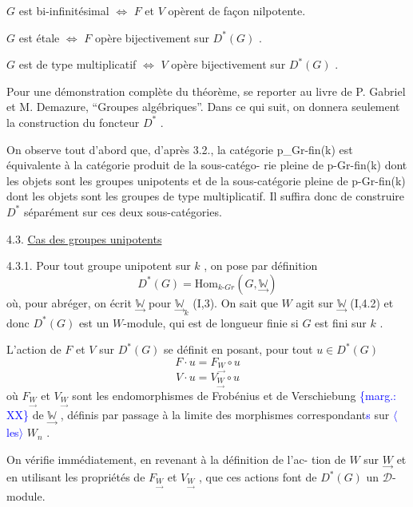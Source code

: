 \documentclass[11pt]{article}
\newcommand{\scanpage}[1]{\par\bigskip\noindent{\small\sffamily[scan #1]}\par}
\newcommand{\mspage}[1]{{\small\sffamily[p.\,#1]}}
\newcommand{\hand}[1]{\textcolor{blue}{#1}}
\newcommand{\inserted}[2][]{\textcolor{blue}{$\langle$#2$\rangle$}}
\newcommand{\margin}[1]{\textcolor{blue}{\{\textsf{marg.:} #1\}}}
\newcommand{\uline}[1]{\underline{#1}}
\begin{document}
$G$ est bi-infinitésimal $\Longleftrightarrow$ $F$ et $V$ opèrent de façon nilpotente.

$G$ est étale $\Longleftrightarrow$ $F$ opère bijectivement sur $D^*(G)$ .

$G$ est de type multiplicatif $\Longleftrightarrow$ $V$ opère bijectivement sur $D^*(G)$ .

Pour une démonstration complète du théorème, se reporter
au livre de P. Gabriel et M. Demazure, ``Groupes algébriques''. Dans ce
qui suit, on donnera seulement la construction du foncteur $D^*$ .

On observe tout d'abord que, d'après 3.2., la catégorie
p\_Gr-fin(k) est équivalente à la catégorie produit de la sous-catégo-%
rie pleine de p-Gr-fin(k) dont les objets sont les groupes unipotents
et de la sous-catégorie pleine de p-Gr-fin(k) dont les objets sont
les groupes de type multiplicatif. Il suffira donc de construire $D^*$
séparément sur ces deux sous-catégories.

4.3. \uline{Cas des groupes unipotents}

4.3.1. Pour tout groupe unipotent sur $k$ , on pose par définition
\[ D^*(G) = \mathrm{Hom}_{k\text{-}Gr}(G,\underset{\rightarrow}{\mathbb{W}}) \]
où, pour abréger, on écrit $\underset{\rightarrow}{\mathbb{W}}$ pour $\underset{\rightarrow}{\mathbb{W}}_k$ (I,3). On sait que $W$ agit sur
$\underset{\rightarrow}{\mathbb{W}}$ (I,4.2) et donc $D^*(G)$ est un $W$-module, qui est de longueur finie si
$G$ est fini sur $k$ .

\mspage{42}

\clearpage
\scanpage{129/43}
\mspage{II.15}

L'action de $F$ et $V$ sur $D^*(G)$ se définit en posant,
pour tout $u \in D^*(G)$
\[ F\cdot u = F_{\underset{\rightarrow}{W}} \circ u \]
\[ V\cdot u = V_{\underset{\rightarrow}{W}} \circ u \]
où $F_{\underset{\rightarrow}{W}}$ et $V_{\underset{\rightarrow}{W}}$ sont les endomorphismes de Frobénius et de Verschiebung
\margin{XX} de $\underset{\rightarrow}{\mathbb{W}}$ , définis par passage à la limite des morphismes correspondant\hand{s} sur \inserted{les} $W_n$ .

On vérifie immédiatement, en revenant à la définition de l'ac-%
tion de $W$ sur $\underset{\rightarrow}{W}$ et en utilisant les propriétés de $F_{\underset{\rightarrow}{W}}$ et $V_{\underset{\rightarrow}{W}}$ , que
ces actions font de $D^*(G)$ un $\mathcal{D}$-module.
\end{document}
